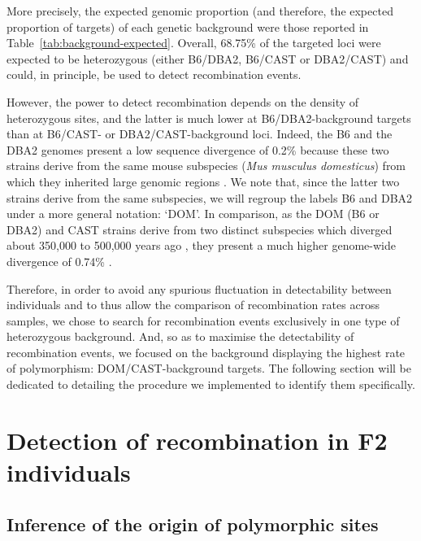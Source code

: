 	
More precisely, the expected genomic proportion (and therefore, the expected proportion of targets) of each genetic background were those reported in Table~\ref{tab:background-expected}.
Overall, 68.75\% of the targeted loci were expected to be heterozygous (either B6/DBA2, B6/CAST or DBA2/CAST) and could, in principle, be used to detect recombination events.

However, the power to detect recombination depends on the density of heterozygous sites, and the latter is much lower at B6/DBA2-background targets than at B6/CAST- or DBA2/CAST-background loci.
Indeed, the B6 and the DBA2 genomes present a low sequence divergence of 0.2\% \citep{keane2011mouse} because these two strains derive from the same mouse subspecies (\textit{Mus musculus domesticus}) from which they inherited large genomic regions \citep{davis2005genomewide}.
We note that, since the latter two strains derive from the same subspecies, we will regroup the labels B6 and DBA2 under a more general notation: ‘DOM’.
In comparison, as the DOM (B6 or DBA2) and CAST strains derive from two distinct subspecies which diverged about 350,000 to 500,000 years ago \citep{geraldes2008inferring}, they present a much higher genome-wide divergence of 0.74\% \citep{keane2011mouse}.

Therefore, in order to avoid any spurious fluctuation in detectability between individuals and to thus allow the comparison of recombination rates across samples, we chose to search for recombination events exclusively in one type of heterozygous background.
And, so as to maximise the detectability of recombination events, we focused on the background displaying the highest rate of polymorphism: DOM/CAST-background targets.
The following section will be dedicated to detailing the procedure we implemented to identify them specifically.







\section{Detection of recombination in F2 individuals}
\subsection{Inference of the origin of polymorphic sites}

